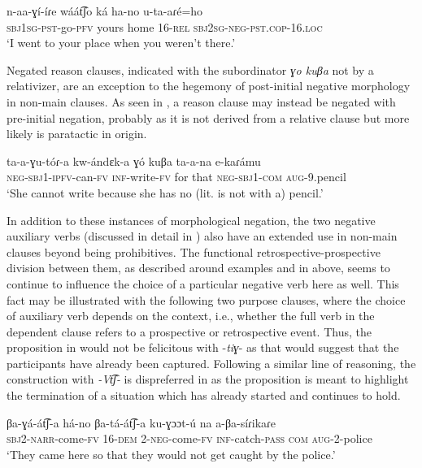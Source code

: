 \documentclass[output=paper,colorlinks,citecolor=brown,draftmode]{langscibook}
\begin{document}
\ea\label{ex:ngo:52} 
    \gll n-aa-ɣí-íɾe wáát͡ʃo ká ha-no u-ta-aɾé=ho \\ 
        \textsc{sbj1sg-pst-}go\textsc{{}-pfv} yours home 16-\textsc{rel} \textsc{sbj2sg-neg-pst.cop-16.loc}\\
    \glt ‘I went to your place when you weren’t there.’
\z 

Negated reason clauses, indicated with the subordinator \textit{ɣo kuβa} not by a relativizer, are an exception to the hegemony of post-initial negative morphology in non-main clauses. As seen in , a reason clause may instead be negated with pre-initial negation, probably as it is not derived from a relative clause but more likely is paratactic in origin. 

\ea\label{ex:ngo:53} 
    \gll ta-a-ɣu-tóɾ{}-a kw-ándɛk-a ɣó kuβa ta-a-na e-kaɾámu\\ 
        \textsc{neg}{}-\textsc{sbj}1-\textsc{ipfv}{}-can-\textsc{fv} \textsc{inf}{}-write-\textsc{fv} for that \textsc{neg}{}-\textsc{sbj1}{}-\textsc{com} \textsc{aug-}9.pencil\\
    \glt ‘She cannot write because she has no (lit. is not with a) pencil.’
\z 

In addition to these instances of morphological negation, the two negative auxiliary verbs (discussed in detail in ) also have an extended use in non-main clauses beyond being prohibitives. The functional retrospective-prospective division between them, as described around examples  and  in  above, seems to continue to influence the choice of a particular negative verb here as well. This fact may be illustrated with the following two purpose clauses, where the choice of auxiliary verb depends on the context, i.e., whether the full verb in the dependent clause refers to a prospective or retrospective event. Thus, the proposition in  would not be felicitous with \nobreakdash-\textit{tiɣ}{}- as that would suggest that the participants have already been captured. Following a similar line of reasoning, the construction with \textit{\nobreakdash-Vt͡ʃ{}-} is dispreferred in  as the proposition is meant to highlight the termination of a situation which has already started and continues to hold.

\ea\label{ex:ngo:54} 
    \gll βa-ɣá{}-át͡ʃ{}-a há-no βa-tá-át͡ʃ-a ku-ɣɔɔt-ú na a{}-βa-síɾikaɾe\\ 
     \textsc{sbj}2-\textsc{narr}{}-come-\textsc{fv} 16-\textsc{dem} 2-\textsc{neg}{}-come-\textsc{fv} \textsc{inf}{}-catch-\textsc{pass} \textsc{com} \textsc{aug-}2-police\\
    \glt ‘They came here so that they would not get caught by the police.’
\z 
\end{document}
